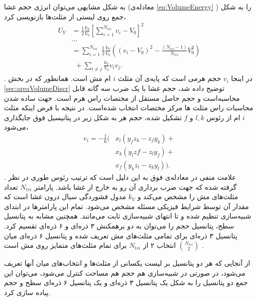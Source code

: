 به شکل مشابهی می‌توان انرژی حجم غشا (معادله‌ی 
\ref{eq:VolumeEnergy}
) را به شکل جمع روی لیستی از مثلث‌ها بازنویسی کرد،
\begin{equation}
\begin{aligned}
U_{V}&=\frac{1}{2}\frac{k_V}{V_0}\left[\sum_{i=1}^{N_{tri}}v_i-V_0\right]^2\\
&...\\
&=\sum_{i=1}^{N_{tri}}\frac{1}{2}\frac{k_V}{V_0}\left((v_i-V_0)^2-\frac{(N_{tri}-1)}{N_{tri}}V_0^2\right)\\
&~~+\sum_{i\neq j}\frac{k_V}{V_0}v_iv_j.
\label{eq:VolumePotentialExpansion}
\end{aligned}
\end{equation}
. در اینجا
$v_i$
حجم هرمی است که پایه‌ی آن مثلث‌
$i$
ام مش است. همانطور که در بخش
\ref{sec:areaVolumeDiscr}
توضیح داده شد، حجم غشا با یک ضرب سه گانه قابل محاسبه‌است و حجم حاصل مستقل از مختصات راس هرم است. جهت ساده شدن محاسبات راس مثلث ها  مرکز مختصات انتخاب شده‌است. در نتیجه با فرض اینکه مثلث 
$i$
ام از رئوس
$l,k$
و
$f$
تشکیل شده، حجم هر به شکل زیر در پتانیسیل فوق جایگذاری می‌شود،
\begin{equation}
\begin{aligned}
v_i=-\frac{1}{6}(&x_l(y_fz_k-z_fy_k)+\\
&x_k(y_lzf-z_ly_f)+\\
&x_f(y_kz_l-z_ky_l)).
\end{aligned}
\label{eq:VolumeTripleProductDef}
\end{equation}
. علامت منفی در معادله‌ی فوق به این دلیل است که ترتیب رئوس طوری در نظر گرفته شده که جهت ضرب برداری آن رو به خارج از غشا باشد. پارامتر 
 $N_{tri}$
تعداد مثلث‌های مش را مشخص می‌کند و 
$k_V$
مدول فشوردگی سیال درون غشا است که مقدار آن توسط شرایط فیزیکی مسئله مشخص می‌شود. تمام این پارامتر‌ها در ابتدای شبیه‌سازی تنظیم شده و تا انتهای شبیه‌سازی ثابت می‌مانند. همچنین مشابه به پتانسیل سطح، پتانسیل حجم را می‌توان به دو برهمکنش ۳ ذره‌ای و ۶ ذره‌ای تقسیم کرد. پتانسیل ۳ ذره‌ای برای تمامی مثلث‌های مش تعریف شده و پتانسیل ۶ ذره‌ای میان انتخاب ۲ از 
$N_{tri}$
برای تمام مثلث‌های متمایز روی مش است
 ${N_{tri} \choose 2}$
.

از آنجایی که هر دو پتانسیل بر لیست یکسانی از مثلث‌ها و انتخاب‌های میان آنها تعریف می‌شود، در صورتی در شبیه‌سازی هم حجم هم مساحت کنترل می‌شود، می‌توان این جمع دو پتانسیل را به شکل یک پتانسیل ۳ ذره‌ای و یک پتانسیل ۶ ذره‌ای سطح و حجم پیاده سازی کرد.










